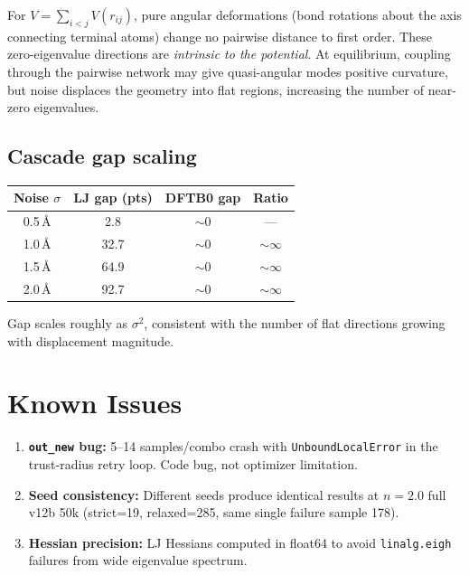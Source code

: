 \documentclass[11pt,a4paper]{article}
\theoremstyle{definition}
\begin{document}
For $V = \sum_{i<j} V(r_{ij})$, pure angular deformations (bond rotations
about the axis connecting terminal atoms) change no pairwise distance to
first order.  These zero-eigenvalue directions are \emph{intrinsic to the
potential}.  At equilibrium, coupling through the pairwise network may
give quasi-angular modes positive curvature, but noise displaces the
geometry into flat regions, increasing the number of near-zero eigenvalues.

\subsection{Cascade gap scaling}

\begin{center}\small
\begin{tabular}{cccc}
\toprule
Noise $\sigma$ & LJ gap (pts) & DFTB0 gap & Ratio \\
\midrule
0.5\,\AA & 2.8 & ${\sim}$0 & --- \\
1.0\,\AA & 32.7 & ${\sim}$0 & ${\sim}\infty$ \\
1.5\,\AA & 64.9 & ${\sim}$0 & ${\sim}\infty$ \\
2.0\,\AA & 92.7 & ${\sim}$0 & ${\sim}\infty$ \\
\bottomrule
\end{tabular}
\end{center}

Gap scales roughly as $\sigma^2$, consistent with the number of flat
directions growing with displacement magnitude.

\section{Known Issues}
\label{app:issues}

\begin{enumerate}[nosep]
  \item \textbf{\texttt{out\_new} bug:}  5--14 samples/combo crash with
    \texttt{UnboundLocalError} in the trust-radius retry loop.  Code bug,
    not optimizer limitation.
  \item \textbf{Seed consistency:}  Different seeds produce identical
    results at $n{=}2.0$ full v12b 50k (strict=19, relaxed=285, same
    single failure sample 178).
  \item \textbf{Hessian precision:}  LJ Hessians computed in float64 to
    avoid \texttt{linalg.eigh} failures from wide eigenvalue spectrum.
\end{enumerate}

\end{document}
